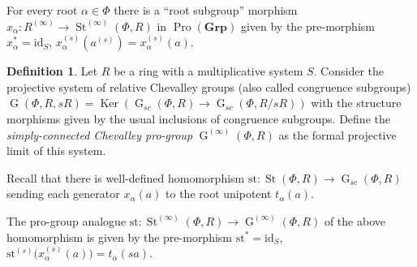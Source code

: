 \documentclass{article}
\numberwithin{equation}{section}
\theoremstyle{definition}
\newtheorem{df}[lemma]{Definition} \Crefname{df}{Definition}{Definitions}
\theoremstyle{remark}
\DeclareMathOperator\St{St}
\DeclareMathOperator\Ker{Ker}
\DeclareMathOperator\GG{G}
\DeclareMathOperator{\Pro}{Pro}
\newcommand{\Group}{\mathbf{Grp}}
\begin{document}
For every root $\alpha \in \Phi$ there is a ``root subgroup'' morphism $x_{\alpha} \colon R^{(\infty)} \to \St^{(\infty)}(\Phi, R)$ in $\Pro(\Group)$ given by the pre-morphism $x_\alpha^* = \mathrm{id}_S$, $x_\alpha^{(s)}(a^{(s)}) = x_\alpha^{(s)}(a)$.

\begin{df}
 Let $R$ be a ring with a multiplicative system $S$.
 Consider the projective system of relative Chevalley groups (also called congruence subgroups) 
 $\GG(\Phi, R, sR) = \Ker\left(\GG_{sc}(\Phi, R) \to \GG_{sc}(\Phi, R/sR)\right)$ with the structure morphisms given by the usual inclusions of congruence subgroups. Define the {\it simply-connected Chevalley pro-group} $\GG^{(\infty)}(\Phi, R)$ as the formal projective limit of this system.
\end{df}

Recall that there is well-defined homomorphism $\mathrm{st}\colon \St(\Phi, R) \to \GG_{sc}(\Phi, R)$ sending each generator $x_\alpha(a)$ to the root unipotent $t_\alpha(a)$. 

The pro-group analogue \(\mathrm{st} \colon \St^{(\infty)}(\Phi, R) \to \GG^{(\infty)}(\Phi, R)\) of the above homomorphism is given by the pre-morphism \(\mathrm{st}^* = \mathrm{id}_S\), \(\mathrm{st}^{(s)}\bigl(x_{\alpha}^{(s)}(a)\bigr) = t_\alpha(sa)\). 
\end{document}
